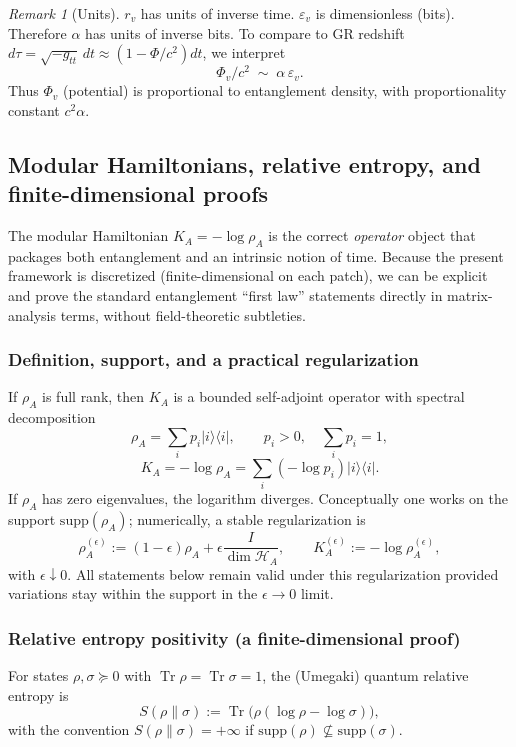 \documentclass[11pt,oneside]{amsbook}
\numberwithin{equation}{section}
\theoremstyle{plain}
\theoremstyle{definition}
\theoremstyle{remark}
\newtheorem{remark}[theorem]{Remark}
\DeclareMathOperator{\Tr}{\mathrm{Tr}}
\newcommand{\ket}[1]{\lvert #1 \rangle}
\newcommand{\bra}[1]{\langle #1 \rvert}
\begin{document}
\begin{remark}[Units]
$r_v$ has units of inverse time.
$\varepsilon_v$ is dimensionless (bits).
Therefore $\alpha$ has units of inverse bits.
To compare to GR redshift $d\tau=\sqrt{-g_{tt}}\,dt\approx (1-\Phi/c^2)dt$, we interpret
\[
\Phi_v/c^2 \;\sim\; \alpha\, \varepsilon_v.
\]
Thus $\Phi_v$ (potential) is proportional to entanglement density, with proportionality constant $c^2\alpha$.
\end{remark}



\subsection{Modular Hamiltonians, relative entropy, and finite-dimensional proofs}
\label{sec:modular_entropy_proofs}

The modular Hamiltonian $K_A=-\log\rho_A$ is the correct \emph{operator} object that packages both entanglement and an intrinsic notion of time.
Because the present framework is discretized (finite-dimensional on each patch), we can be explicit and prove the standard entanglement ``first law'' statements directly in matrix-analysis terms, without field-theoretic subtleties.

\subsubsection{Definition, support, and a practical regularization}
If $\rho_A$ is full rank, then $K_A$ is a bounded self-adjoint operator with spectral decomposition
\[
\rho_A=\sum_i p_i \ket{i}\bra{i},\qquad p_i>0,\quad \sum_i p_i=1,
\]
\[
K_A=-\log\rho_A = \sum_i (-\log p_i)\ket{i}\bra{i}.
\]
If $\rho_A$ has zero eigenvalues, the logarithm diverges.
Conceptually one works on the support $\mathrm{supp}(\rho_A)$; numerically, a stable regularization is
\begin{equation}
\label{eq:rho_eps_regularization}
\rho_A^{(\epsilon)}:=(1-\epsilon)\rho_A+\epsilon\frac{I}{\dim\mathcal{H}_A},\qquad
K_A^{(\epsilon)}:=-\log\rho_A^{(\epsilon)},
\end{equation}
with $\epsilon\downarrow 0$.
All statements below remain valid under this regularization provided variations stay within the support in the $\epsilon\to 0$ limit.

\subsubsection{Relative entropy positivity (a finite-dimensional proof)}
For states $\rho,\sigma\succeq 0$ with $\Tr\rho=\Tr\sigma=1$, the (Umegaki) quantum relative entropy is
\[
S(\rho\|\sigma):=\Tr\bigl(\rho(\log\rho-\log\sigma)\bigr),
\]
with the convention $S(\rho\|\sigma)=+\infty$ if $\mathrm{supp}(\rho)\not\subseteq \mathrm{supp}(\sigma)$.
\end{document}
